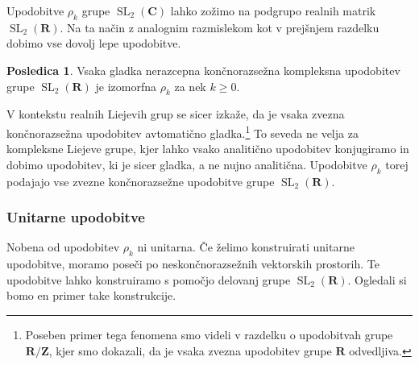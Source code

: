 \documentclass[11pt]{book}
\def\ZZ{\mathbf{Z}}
\def\RR{\mathbf{R}}
\def\CC{\mathbf{C}}
\DeclareMathOperator\SL{SL}
\theoremstyle{definition}
\theoremstyle{zgled}
\theoremstyle{odprtproblem}
\theoremstyle{domacanaloga}
\theoremstyle{izrek}
\newtheorem*{posledica}{Posledica}
\begin{document}
Upodobitve $\rho_k$ grupe $\SL_2(\CC)$ lahko zožimo na podgrupo realnih matrik $\SL_2(\RR)$. Na ta način z analognim razmislekom kot v prejšnjem razdelku dobimo vse dovolj lepe upodobitve. 

\begin{posledica}
Vsaka gladka nerazcepna končnorazsežna kompleksna upodobitev grupe $\SL_2(\RR)$ je izomorfna $\rho_k$ za nek $k \geq 0$.
\end{posledica}

V kontekstu realnih Liejevih grup se sicer izkaže, da je vsaka zvezna končnorazsežna upodobitev avtomatično gladka.\footnote{Poseben primer tega fenomena smo videli v razdelku o upodobitvah grupe $\RR/\ZZ$, kjer smo dokazali, da je vsaka zvezna upodobitev grupe $\RR$ odvedljiva.} To seveda ne velja za kompleksne Liejeve grupe, kjer lahko vsako analitično upodobitev konjugiramo in dobimo upodobitev, ki je sicer gladka, a ne nujno analitična. Upodobitve $\rho_k$ torej podajajo vse zvezne končnorazsežne upodobitve grupe $\SL_2(\RR)$. 

\subsubsection{Unitarne upodobitve}

Nobena od upodobitev $\rho_k$ ni unitarna. Če želimo konstruirati unitarne upodobitve, moramo poseči po neskončnorazsežnih vektorskih prostorih. Te upodobitve lahko konstruiramo s pomočjo delovanj grupe $\SL_2(\RR)$. Ogledali si bomo en primer take konstrukcije.
\end{document}
